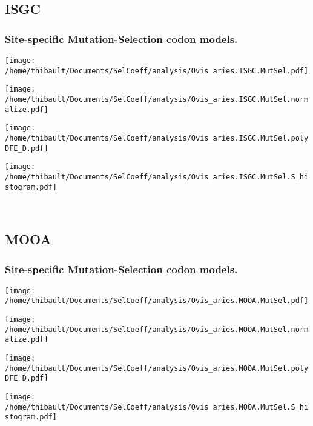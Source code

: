 \subsection{ISGC} 
 
\subsubsection*{Site-specific Mutation-Selection codon models.} 
\begin{minipage}{0.49\linewidth} 
\texttt{[image: /home/thibault/Documents/SelCoeff/analysis/Ovis\_aries.ISGC.MutSel.pdf]} 
\end{minipage}
\begin{minipage}{0.49\linewidth} 
\texttt{[image: /home/thibault/Documents/SelCoeff/analysis/Ovis\_aries.ISGC.MutSel.normalize.pdf]} 
\end{minipage}
\begin{minipage}{0.49\linewidth} 
\texttt{[image: /home/thibault/Documents/SelCoeff/analysis/Ovis\_aries.ISGC.MutSel.polyDFE\_D.pdf]} 
\end{minipage}
\begin{minipage}{0.49\linewidth} 
\texttt{[image: /home/thibault/Documents/SelCoeff/analysis/Ovis\_aries.ISGC.MutSel.S\_histogram.pdf]} 
\end{minipage}
\\ 
\subsection{MOOA} 
 
\subsubsection*{Site-specific Mutation-Selection codon models.} 
\begin{minipage}{0.49\linewidth} 
\texttt{[image: /home/thibault/Documents/SelCoeff/analysis/Ovis\_aries.MOOA.MutSel.pdf]} 
\end{minipage}
\begin{minipage}{0.49\linewidth} 
\texttt{[image: /home/thibault/Documents/SelCoeff/analysis/Ovis\_aries.MOOA.MutSel.normalize.pdf]} 
\end{minipage}
\begin{minipage}{0.49\linewidth} 
\texttt{[image: /home/thibault/Documents/SelCoeff/analysis/Ovis\_aries.MOOA.MutSel.polyDFE\_D.pdf]} 
\end{minipage}
\begin{minipage}{0.49\linewidth} 
\texttt{[image: /home/thibault/Documents/SelCoeff/analysis/Ovis\_aries.MOOA.MutSel.S\_histogram.pdf]} 
\end{minipage}
\\ 
